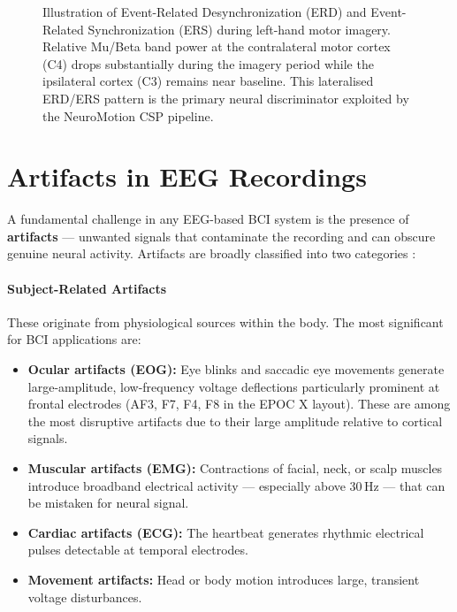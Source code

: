 \documentclass[12pt, a4paper, oneside]{report}
\begin{document}
\begin{figure}[!htbp]
\centering
\caption{Illustration of Event-Related Desynchronization (ERD) and
Event-Related Synchronization (ERS) during left-hand motor imagery. Relative
Mu/Beta band power at the contralateral motor cortex (C4) drops substantially
during the imagery period while the ipsilateral cortex (C3) remains near
baseline. This lateralised ERD/ERS pattern is the primary neural discriminator
exploited by the NeuroMotion CSP pipeline.}
\label{fig:erd_ers}
\end{figure}

\section{Artifacts in EEG Recordings}
\label{sec:artifacts}

A fundamental challenge in any EEG-based BCI system is the presence of
\textbf{artifacts} --- unwanted signals that contaminate the recording and can
obscure genuine neural activity. Artifacts are broadly classified into two
categories \cite{teplan2002}:

\paragraph{Subject-Related Artifacts}
These originate from physiological sources within the body. The most significant
for BCI applications are:

\begin{itemize}
  \item \textbf{Ocular artifacts (EOG):} Eye blinks and saccadic eye movements
        generate large-amplitude, low-frequency voltage deflections particularly
        prominent at frontal electrodes (AF3, F7, F4, F8 in the EPOC X layout).
        These are among the most disruptive artifacts due to their large amplitude
        relative to cortical signals.
  \item \textbf{Muscular artifacts (EMG):} Contractions of facial, neck, or
        scalp muscles introduce broadband electrical activity --- especially above
        30\,Hz --- that can be mistaken for neural signal.
  \item \textbf{Cardiac artifacts (ECG):} The heartbeat generates rhythmic
        electrical pulses detectable at temporal electrodes.
  \item \textbf{Movement artifacts:} Head or body motion introduces large,
        transient voltage disturbances.
\end{itemize}
\end{document}
